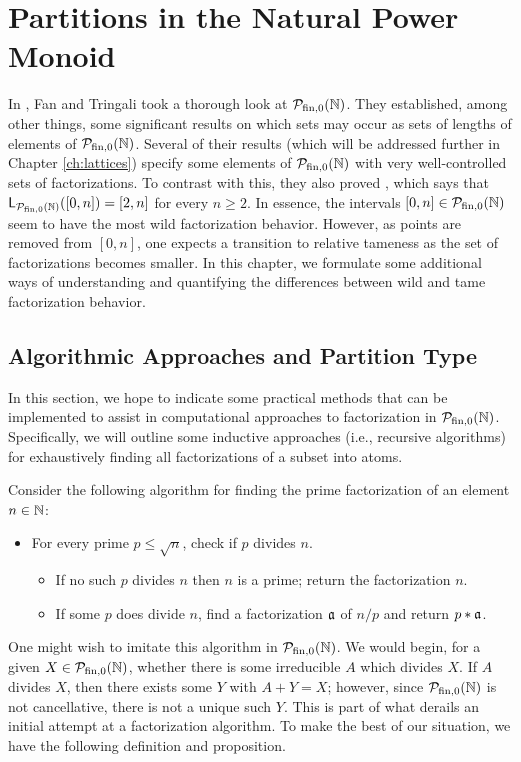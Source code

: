 \chapter{Partitions in the Natural Power Monoid} \label{ch:partitions}

In \cite[Section 4]{fan-tringali18}, Fan and Tringali took a thorough look at $\PN$.
They established, among other things, some significant results on which sets may occur as sets of lengths of elements of $\PN$.  
Several of their results (which will be addressed further in Chapter \ref{ch:lattices}) specify some elements of $\PN$ with very well-controlled sets of factorizations.
To contrast with this, they also proved \cite[Proposition 4.8]{fan-tringali18}, which says that $\mathsf{L}_\PN([ 0,n ]) = [ 2,n ]$ for every $n\ge 2$.
In essence, the intervals $[ 0,n ]\in \PN$ seem to have the most wild factorization behavior.
However, as points are removed from $[ 0,n ]$, one expects a transition to relative tameness as the set of factorizations becomes smaller.
In this chapter, we formulate some additional ways of understanding and quantifying the differences between wild and tame factorization behavior.


\section{Algorithmic Approaches and Partition Type} \label{sec:algorithms}

In this section, we hope to indicate some practical methods that can be implemented to assist in computational approaches to factorization in $\PN$.
Specifically, we will outline some inductive approaches (i.e., recursive algorithms) for exhaustively finding all factorizations of a subset into atoms.

Consider the following algorithm for finding the prime factorization of an element $n\in \NN$:
\begin{itemize}
	\item For every prime $p \le \sqrt{n}$, check if $p$ divides $n$.
	\begin{itemize}
		\item If no such $p$ divides $n$ then $n$ is a prime; return the factorization $n$.
		\item If some $p$ does divide $n$, find a factorization $\aa$ of $n/p$ and return $p * \aa$.
	\end{itemize}
\end{itemize}
One might wish to imitate this algorithm in $\PN$.
We would begin, for a given $X \in \PN$, whether there is some irreducible $A$ which divides $X$.
If $A$ divides $X$, then there exists some $Y$ with $A + Y = X$; however, since $\PN$ is not cancellative, there is not a unique such $Y$.
This is part of what derails an initial attempt at a factorization algorithm.
To make the best of our situation, we have the following definition and proposition. 

